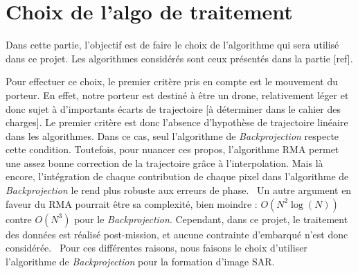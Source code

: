 \section{Choix de l'algo de traitement}
Dans cette partie, l'objectif est de faire le choix de l'algorithme qui sera utilisé dans ce projet. Les algorithmes considérés sont ceux présentés dans la partie [ref].

Pour effectuer ce choix, le premier critère pris en compte est le mouvement du porteur. En effet, notre porteur est destiné à être un drone, relativement léger et donc sujet à d’importants écarts de trajectoire [à déterminer dans le cahier des charges]. Le premier critère est donc l’absence d’hypothèse de trajectoire linéaire dans les algorithmes. Dans ce cas, seul l’algorithme de \textit{Backprojection} respecte cette condition. Toutefois, pour nuancer ces propos, l’algorithme RMA permet une assez bonne correction de la trajectoire grâce à l’interpolation. Mais là encore, l’intégration de chaque contribution de chaque pixel dans l’algorithme de \textit{Backprojection} le rend plus robuste aux erreurs de phase. \
Un autre argument en faveur du RMA pourrait être sa complexité, bien moindre : $O(N^2 \log(N))$ contre $O(N^3)$ pour le \textit{Backprojection}. Cependant, dans ce projet, le traitement des données est réalisé post-mission, et aucune contrainte d’embarqué n’est donc considérée. \
Pour ces différentes raisons, nous faisons le choix d’utiliser l’algorithme de \textit{Backprojection} pour la formation d’image SAR.